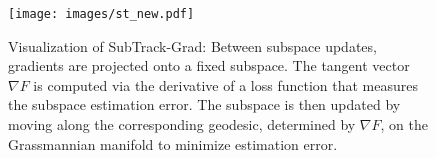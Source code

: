 \begin{figure}[!t]
    \centering
    \texttt{[image: images/st\_new.pdf]}
    \caption{\small{Visualization of SubTrack-Grad: Between subspace updates, gradients are projected onto a fixed subspace. The tangent vector \(\nabla F\) is computed via the derivative of a loss function that measures the subspace estimation error. The subspace is then updated by moving along the corresponding geodesic, determined by \(\nabla F\), on the Grassmannian manifold to minimize estimation error.}}
    \label{fig:method}
    \vspace{-10pt}
\end{figure}
